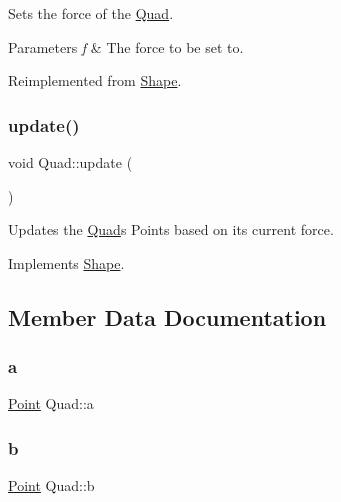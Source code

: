 Sets the force of the \mbox{\hyperlink{class_quad}{Quad}}. 


\begin{DoxyParams}{Parameters}
{\em f} & The force to be set to. \\
\hline
\end{DoxyParams}


Reimplemented from \mbox{\hyperlink{class_shape_a76d8009348239dbf7426ae54f19844d2}{Shape}}.

\mbox{\label{class_quad_a5e8eed8827894a4cf680b827a90d9d28}} 
\subsubsection{\texorpdfstring{update()}{update()}}
{\footnotesize\ttfamily void Quad\+::update (\begin{DoxyParamCaption}{ }\end{DoxyParamCaption})\hspace{0.3cm}{\ttfamily [virtual]}}



Updates the \mbox{\hyperlink{class_quad}{Quad}}\textquotesingle{}s Points based on its current force. 



Implements \mbox{\hyperlink{class_shape_a303c47b13b9339dc021e040bbba72651}{Shape}}.



\subsection{Member Data Documentation}
\mbox{\label{class_quad_a6d2e2a508ba54fd2c0d286850d2fc99f}} 
\subsubsection{\texorpdfstring{a}{a}}
{\footnotesize\ttfamily \mbox{\hyperlink{class_point}{Point}} Quad\+::a}

\mbox{\label{class_quad_a429f3bf619a9e29f56e03c701001d508}} 
\subsubsection{\texorpdfstring{b}{b}}
{\footnotesize\ttfamily \mbox{\hyperlink{class_point}{Point}} Quad\+::b}

